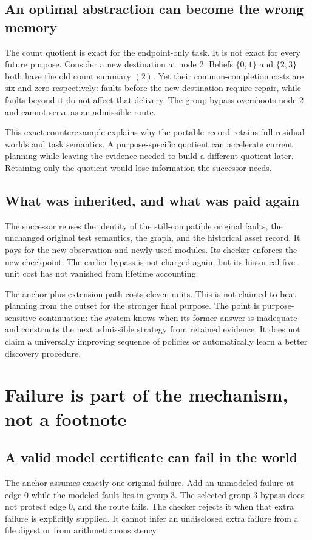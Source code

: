 \documentclass[11pt,letterpaper]{article}
\theoremstyle{remark}\newtheorem{remark}{Remark}[section]
\begin{document}
\subsection{An optimal abstraction can become the wrong memory}
The count quotient is exact for the endpoint-only task. It is not exact for every future purpose. Consider a new destination at node 2. Beliefs $\{0,1\}$ and $\{2,3\}$ both have the old count summary $(2)$. Yet their common-completion costs are six and zero respectively: faults before the new destination require repair, while faults beyond it do not affect that delivery. The group bypass overshoots node 2 and cannot serve as an admissible route.

This exact counterexample explains why the portable record retains full residual worlds and task semantics. A purpose-specific quotient can accelerate current planning while leaving the evidence needed to build a different quotient later. Retaining only the quotient would lose information the successor needs.

\subsection{What was inherited, and what was paid again}
The successor reuses the identity of the still-compatible original faults, the unchanged original test semantics, the graph, and the historical asset record. It pays for the new observation and newly used modules. Its checker enforces the new checkpoint. The earlier bypass is not charged again, but its historical five-unit cost has not vanished from lifetime accounting.

The anchor-plus-extension path costs eleven units. This is not claimed to beat planning from the outset for the stronger final purpose. The point is purpose-sensitive continuation: the system knows when its former answer is inadequate and constructs the next admissible strategy from retained evidence. It does not claim a universally improving sequence of policies or automatically learn a better discovery procedure.

\section{Failure is part of the mechanism, not a footnote}
\label{sec:failure}
\subsection{A valid model certificate can fail in the world}
The anchor assumes exactly one original failure. Add an unmodeled failure at edge 0 while the modeled fault lies in group 3. The selected group-3 bypass does not protect edge 0, and the route fails. The checker rejects it when that extra failure is explicitly supplied. It cannot infer an undisclosed extra failure from a file digest or from arithmetic consistency.
\end{document}
